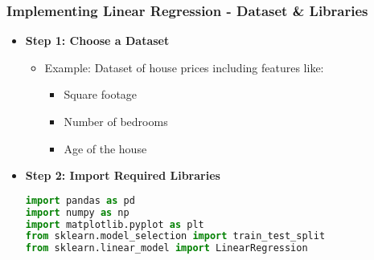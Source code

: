 \documentclass[aspectratio=169]{beamer}
\begin{document}
\begin{frame}[fragile]
    \frametitle{Implementing Linear Regression - Dataset & Libraries}
    \begin{itemize}
        \item \textbf{Step 1: Choose a Dataset}
        \begin{itemize}
            \item Example: Dataset of house prices including features like:
            \begin{itemize}
                \item Square footage
                \item Number of bedrooms
                \item Age of the house
            \end{itemize}
        \end{itemize}
        
        \item \textbf{Step 2: Import Required Libraries}
        \begin{lstlisting}[language=Python]
import pandas as pd
import numpy as np
import matplotlib.pyplot as plt
from sklearn.model_selection import train_test_split
from sklearn.linear_model import LinearRegression
        \end{lstlisting}
    \end{itemize}
\end{frame}
\end{document}
